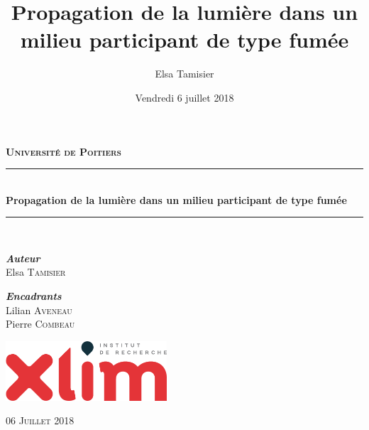 \documentclass[12pt]{report}
\title{Propagation de la lumière dans un milieu participant de type fumée}
\author{Elsa Tamisier}
\date{Vendredi 6 juillet 2018}
\begin{document}

\begin{titlepage}
\begin{center}


{\large \textbf{\textsc{Université de Poitiers}}}\\[0.5cm]

\vspace{6cm}

\rule{\linewidth}{0.5mm} \\[0.4cm]
{ \LARGE \bfseries Propagation de la lumière dans un milieu participant de type fumée \\[0.4cm] }
\rule{\linewidth}{0.5mm} \\[1.5cm]

\noindent
\begin{minipage}[t][0.4cm]{0.9\textwidth}
  \begin{flushleft} \large
    \emph{\textbf{Auteur}}\\
    Elsa \textsc{Tamisier}
  \end{flushleft}
\end{minipage}%

\begin{minipage}{0.9\textwidth}
  \begin{flushright} \large
        \emph{\textbf{Encadrants}} \\
        Lilian \textsc{Aveneau}\\
        Pierre \textsc{Combeau}\\
    \end{flushright}
\end{minipage}

\vspace{5cm}
\includegraphics[width=60mm]{xlim_logo.png}\\

\vfill

{\textsc{06 Juillet 2018}}

\end{center}
\end{titlepage}


\end{document}
